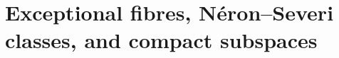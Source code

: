\section{Exceptional fibres, N\'eron--Severi classes, and compact subspaces}\hypertarget{tag-01PP}{}\label{fam:section:D}